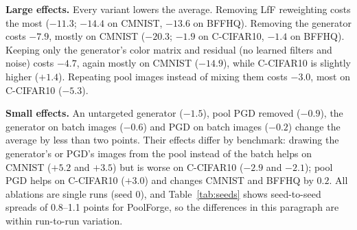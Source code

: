\textbf{Large effects.} Every variant lowers the average. Removing LfF reweighting costs the most ($-11.3$; $-14.4$
on CMNIST, $-13.6$ on BFFHQ). Removing the generator costs $-7.9$, mostly on CMNIST ($-20.3$; $-1.9$ on C-CIFAR10,
$-1.4$ on BFFHQ). Keeping only the generator's color matrix and residual (no learned filters and noise) costs $-4.7$,
again mostly on CMNIST ($-14.9$), while C-CIFAR10 is slightly higher ($+1.4$). Repeating pool images instead of
mixing them costs $-3.0$, most on C-CIFAR10 ($-5.3$).

\textbf{Small effects.} An untargeted generator ($-1.5$), pool PGD removed ($-0.9$), the generator on batch images
($-0.6$) and PGD on batch images ($-0.2$) change the average by less than two points. Their effects differ by
benchmark: drawing the generator's or PGD's images from the pool instead of the batch helps on CMNIST ($+5.2$ and
$+3.5$) but is worse on C-CIFAR10 ($-2.9$ and $-2.1$); pool PGD helps on C-CIFAR10 ($+3.0$) and changes CMNIST and
BFFHQ by $0.2$. All ablations are single runs (seed 0), and Table~\ref{tab:seeds} shows seed-to-seed spreads of
0.8--1.1 points for PoolForge, so the differences in this paragraph are within run-to-run variation.
